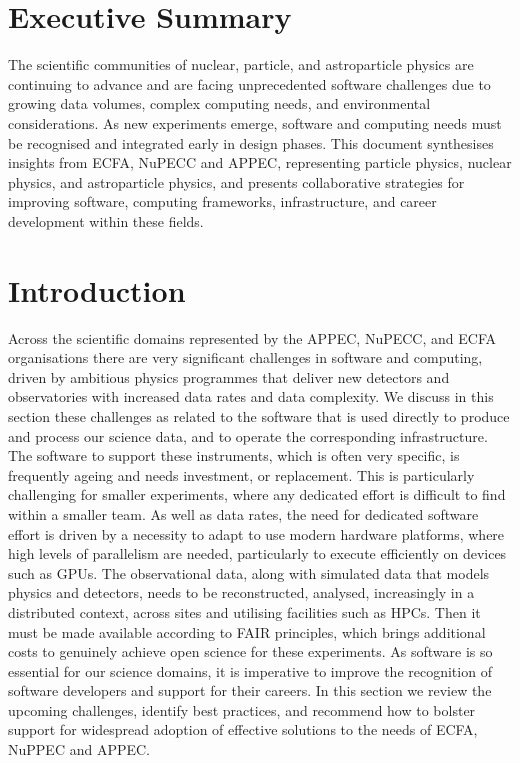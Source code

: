 \section{Executive Summary}

The scientific communities of nuclear, particle, and astroparticle physics are continuing to advance and are facing unprecedented software challenges due to growing data volumes, complex computing needs, and environmental considerations. As new experiments emerge, software and computing needs must be recognised and integrated early in design phases. This document synthesises insights from ECFA, NuPECC and APPEC, representing particle physics, nuclear physics, and astroparticle physics, and presents collaborative strategies for improving software, computing frameworks, infrastructure, and career development within these fields.


\section{Introduction}

Across the scientific domains represented by the APPEC, NuPECC, and ECFA organisations there are very significant challenges in software and computing, driven by ambitious physics programmes that deliver new detectors and observatories with increased data rates and data complexity. We discuss in this section these challenges as related to the software that is used directly to produce and process our science data, and to operate the corresponding infrastructure. The software to support these instruments, which is often very specific, is frequently ageing and needs investment, or replacement. This is particularly challenging for smaller experiments, where any dedicated effort is difficult to find within a smaller team. As well as data rates, the need for dedicated software effort is driven by a necessity to adapt to use modern hardware platforms, where high levels of parallelism are needed, particularly to execute efficiently on devices such as GPUs. The observational data, along with simulated data that models physics and detectors, needs to be reconstructed, analysed, increasingly in a distributed context, across sites and utilising facilities such as HPCs. Then it must be made available according to FAIR principles, which brings additional costs to genuinely achieve open science for these experiments. As software is so essential for our science domains, it is imperative to improve the recognition of software developers and support for their careers.
In this section we review the upcoming challenges, identify best practices, and recommend how to bolster support for widespread adoption of effective solutions to the needs of ECFA, NuPPEC and APPEC.


